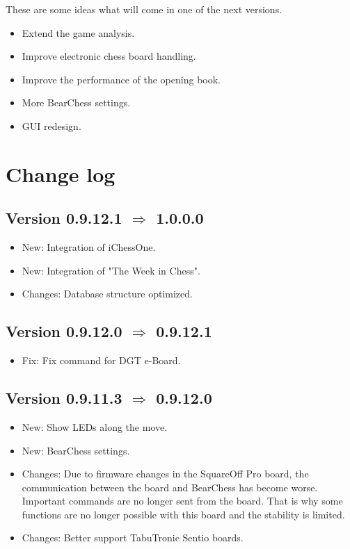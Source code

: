\documentclass[11pt,a4paper]{article}
\begin{document}
These are some ideas what will come in one of the next versions.

\begin{itemize}		
		\item Extend the game analysis.
		\item Improve electronic chess board handling.
  	    \item Improve the performance of the opening book.
    	\item More BearChess settings.
   		\item GUI redesign.
\end{itemize} 

\pagebreak

\listoffigures

\pagebreak

\section{Change log}


\subsection*{Version 0.9.12.1 $\Rightarrow$  1.0.0.0}
\begin{itemize}	
	\item {\color{blue}New}: Integration of iChessOne.
	\item {\color{blue}New}: Integration of "The Week in Chess".
	\item {\color{teal}Changes}: Database structure optimized.
\end{itemize}

\subsection*{Version 0.9.12.0 $\Rightarrow$  0.9.12.1}
\begin{itemize}	
	\item {\color{red}Fix}: Fix command for DGT e-Board.
\end{itemize}

\subsection*{Version 0.9.11.3 $\Rightarrow$  0.9.12.0}
\begin{itemize}	
	\item {\color{blue}New}: Show LEDs along the move.
	\item {\color{blue}New}: BearChess settings.
	\item {\color{teal}Changes}: Due to firmware changes in the SquareOff Pro board, the communication between the board and BearChess has become worse. Important commands are no longer sent from the board. That is why some functions are no longer possible with this board and the stability is limited.
	\item {\color{teal}Changes}: Better support TabuTronic Sentio boards.
\end{itemize}
\end{document}
